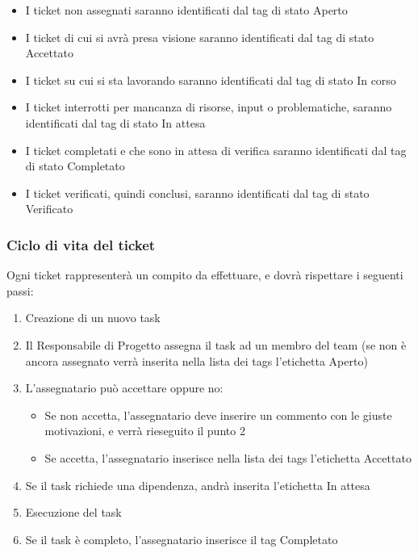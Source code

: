 \begin{itemize}
	
	\item I ticket non assegnati saranno identificati dal tag di stato Aperto
	\item I ticket di cui si avrà presa visione saranno identificati dal tag di stato Accettato
	\item I ticket su cui si sta lavorando saranno identificati dal tag di stato In corso
	\item I ticket interrotti per mancanza di risorse, input o problematiche, saranno identificati dal tag di stato In attesa
	\item I ticket completati e che sono in attesa di verifica saranno identificati dal tag di stato Completato
	\item I ticket verificati, quindi conclusi, saranno identificati dal tag di stato Verificato
	
\end{itemize}

\subsubsection{Ciclo di vita del ticket}

Ogni ticket rappresenterà un compito da effettuare, e dovrà rispettare i seguenti passi:
\begin{enumerate}
	\item Creazione di un nuovo task
	\item Il Responsabile di Progetto assegna il task ad un membro del team (se non è ancora assegnato verrà inserita nella lista dei tags l’etichetta Aperto)
	\item L’assegnatario può accettare oppure no:
	\begin{itemize}
		\item Se non accetta, l’assegnatario deve inserire un commento con le giuste motivazioni, e verrà rieseguito il punto 2
		\item Se accetta, l’assegnatario inserisce nella lista dei tags l’etichetta Accettato
	\end{itemize}
	\item Se il task richiede una dipendenza, andrà inserita l’etichetta In attesa
	\item Esecuzione del task
	\item Se il task è completo, l’assegnatario inserisce il tag Completato	
\end{enumerate}

